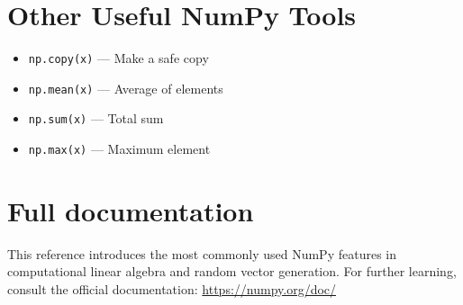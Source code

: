 \documentclass{article}
\begin{document}
\section{Other Useful NumPy Tools}
\begin{itemize}
  \item \texttt{np.copy(x)} — Make a safe copy
  \item \texttt{np.mean(x)} — Average of elements
  \item \texttt{np.sum(x)} — Total sum
  \item \texttt{np.max(x)} — Maximum element
\end{itemize}

\section{Full documentation}
This reference introduces the most commonly used NumPy features in computational linear algebra and random vector generation. For further learning, consult the official documentation: \url{https://numpy.org/doc/}
\end{document}
